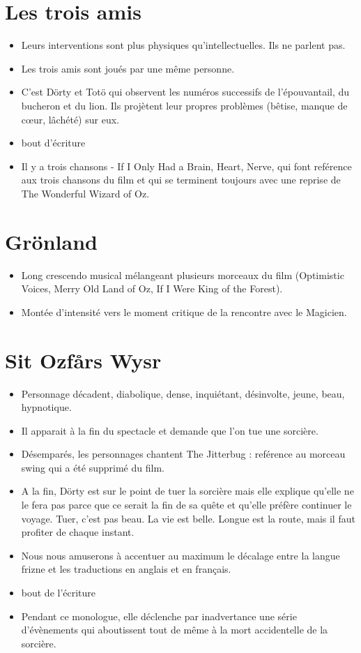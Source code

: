 \documentclass[a4paper]{article}
\newcommand{\mssection}[1]{\section{#1}}
\begin{document}
\mssection{Les trois amis}
\begin{itemize}
\item Leurs interventions sont plus physiques qu'intellectuelles. Ils ne
parlent pas.
\item Les trois amis sont joués par une même personne.
\item C'est Dörty et Totö qui observent les numéros successifs de
l'épouvantail, du bucheron et du lion. Ils projètent leur propres problèmes
(bêtise, manque de cœur, lâchété) sur eux.
\item bout d'écriture
\item Il y a trois chansons - If I Only Had a Brain, Heart, Nerve, qui font
reférence aux trois chansons du film et qui se terminent toujours avec une
reprise de The Wonderful Wizard of Oz.
\end{itemize}
\mssection{Grönland}
\begin{itemize}
\item Long crescendo musical mélangeant plusieurs morceaux du film
(Optimistic Voices, Merry Old Land of Oz, If I Were King of the Forest).
\item Montée d'intensité vers le moment critique de la rencontre avec le
Magicien.
\end{itemize}
\mssection{Sit Ozfårs Wysr}
\begin{itemize}
\item Personnage décadent, diabolique, dense, inquiétant, désinvolte, jeune,
beau, hypnotique.
\item Il apparait à la fin du spectacle et demande que l'on tue une
sorcière.
\item Désemparés, les personnages chantent The Jitterbug : reférence au
morceau swing qui a été supprimé du film.
\item A la fin, Dörty est sur le point de tuer la sorcière mais elle
explique qu'elle ne le fera pas parce que ce serait la fin de sa quête et
qu'elle préfère continuer le voyage. Tuer, c'est pas beau. La vie est belle.
Longue est la route, mais il faut profiter de chaque instant.
\item Nous nous amuserons à accentuer au maximum le décalage entre la langue
frizne et les traductions en anglais et en français.
\item bout de l'écriture
\item Pendant ce monologue, elle déclenche par inadvertance une série
d'évènements qui aboutissent tout de même à la mort accidentelle de la sorcière.
\end{itemize}
\end{document}
